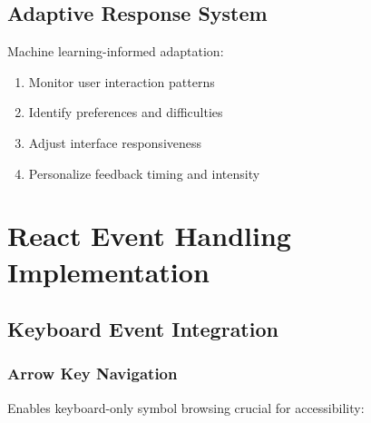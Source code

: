 \documentclass[12pt, a4paper]{article}
\begin{document}
\subsection{Adaptive Response System}

Machine learning-informed adaptation:

\begin{enumerate}[leftmargin=*]
    \item Monitor user interaction patterns
    \item Identify preferences and difficulties
    \item Adjust interface responsiveness
    \item Personalize feedback timing and intensity
\end{enumerate}

\newpage

\section{React Event Handling Implementation}

\subsection{Keyboard Event Integration}

\subsubsection{Arrow Key Navigation}

Enables keyboard-only symbol browsing crucial for accessibility:
\end{document}
